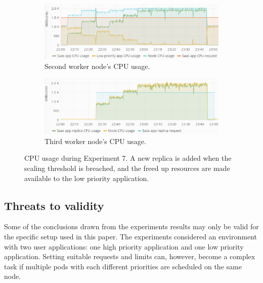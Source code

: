 %
%
\begin{figure}
\centering
\begin{subfigure}[b]{\columnwidth}
\centering
\includegraphics[width=0.75\columnwidth]{Images/Experiments/CPU/Grafana/cpu-saas-lpp-hpa-li-1.PNG}
\caption{Second worker node's CPU usage.}
\label{fig:cpu-saas-lpp-hpa-li-1}
\end{subfigure}
\hfill
\centering
\begin{subfigure}[b]{\columnwidth}
\centering
\includegraphics[width=0.75\columnwidth]{Images/Experiments/CPU/Grafana/cpu-saas-lpp-hpa-li-2.PNG}
\caption{Third worker node's CPU usage.}
\label{fig:cpu-saas-lpp-hpa-li-2}
\end{subfigure}
\hfill
\vspace*{-5mm}
\caption{CPU usage during Experiment 7. A new replica is added when the scaling threshold is breached, and the freed up resources are made available to the low priority application.}
\label{fig:cpu-saas-lpp-hpa-li}
\end{figure}

\subsection{Threats to validity}
Some of the conclusions drawn from the experiments results may only be valid for the specific setup used in this paper. The experiments considered an environment with two user applications: one high priority application and one low priority application. Setting suitable requests and limits can, however, become a complex task if multiple pods with each different priorities are scheduled on the same node.

